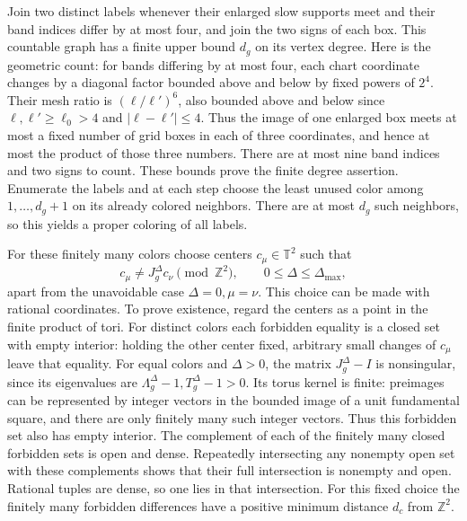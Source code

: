 \documentclass[10pt,a4paper]{article}
\newcounter{none}
\begin{document}
Join two distinct labels whenever their enlarged slow supports meet
and their band indices differ by at most four, and join the two signs
of each box.  This countable graph has a finite upper bound $d_g$ on
its vertex degree.  Here is the geometric count: for bands differing
by at most four, each chart coordinate changes by a diagonal factor
bounded above and below by fixed powers of $2^4$.  Their mesh ratio
is $(\ell/\ell')^6$, also bounded above and below since
$\ell,\ell'\ge\ell_0>4$ and $|\ell-\ell'|\le4$.  Thus the image of
one enlarged box meets at most a fixed number of grid boxes in each
of three coordinates, and hence at most the product of those three
numbers.  There are at most nine band indices and two signs to count.
These bounds prove the finite degree assertion.  Enumerate the labels
and at each step choose the least unused color among
$1,\ldots,d_g+1$ on its already colored neighbors.  There are at most
$d_g$ such neighbors, so this yields a proper coloring of all labels.

For these finitely many colors choose centers $c_\mu\in\mathbb T^2$
such that
\[
 c_\mu\ne J_g^\Delta c_\nu\pmod{\mathbb Z^2},
 \qquad 0\le\Delta\le\Delta_{\max},
\]
apart from the unavoidable case $\Delta=0,\mu=\nu$.  This choice can
be made with rational coordinates.  To prove existence, regard the
centers as a point in the finite product of tori.  For distinct colors
each forbidden equality is a closed set with empty interior: holding
the other center fixed, arbitrary small changes of $c_\mu$ leave that
equality.  For equal colors and $\Delta>0$, the matrix
$J_g^\Delta-I$ is nonsingular, since its eigenvalues are
$\Lambda_g^\Delta-1,T_g^\Delta-1>0$.  Its torus kernel is finite:
preimages can be represented by integer vectors in the bounded image
of a unit fundamental square, and there are only finitely many such
integer vectors.  Thus this forbidden set also has empty interior.
The complement of each of the finitely many closed forbidden sets is
open and dense.  Repeatedly intersecting any nonempty open set with
these complements shows that their full intersection is nonempty and
open.  Rational tuples are dense, so one lies in that intersection.
For this fixed choice the finitely many forbidden differences have
a positive minimum distance $d_c$ from $\mathbb Z^2$.
\end{document}
